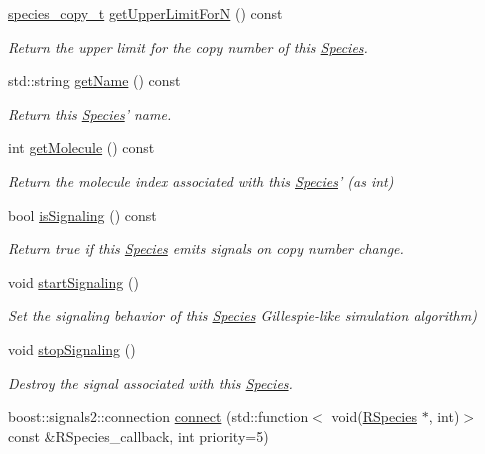 \begin{DoxyCompactItemize}
\hyperlink{common_8h_a3503f321fd36304ee274141275cca586}{species\-\_\-copy\-\_\-t} \hyperlink{classchem_1_1Species_a05fbe0a05f028beb1bb729f19d44a56a}{get\-Upper\-Limit\-For\-N} () const 
\begin{DoxyCompactList}\small\item\em Return the upper limit for the copy number of this \hyperlink{classchem_1_1Species}{Species}. \end{DoxyCompactList}\item 
std\-::string \hyperlink{classchem_1_1Species_aa32c8f7fb344c68539a927c6a7f916c7}{get\-Name} () const 
\begin{DoxyCompactList}\small\item\em Return this \hyperlink{classchem_1_1Species}{Species}' name. \end{DoxyCompactList}\item 
int \hyperlink{classchem_1_1Species_a330ef4514a8979a6ea0e6f71ed5cb820}{get\-Molecule} () const 
\begin{DoxyCompactList}\small\item\em Return the molecule index associated with this \hyperlink{classchem_1_1Species}{Species}' (as int) \end{DoxyCompactList}\item 
bool \hyperlink{classchem_1_1Species_aa412f592e88600b48e3df591fc4cd655}{is\-Signaling} () const 
\begin{DoxyCompactList}\small\item\em Return true if this \hyperlink{classchem_1_1Species}{Species} emits signals on copy number change. \end{DoxyCompactList}\item 
void \hyperlink{classchem_1_1Species_a2d3d9f6e7c7d9c7bdd87ff5373a7d08c}{start\-Signaling} ()
\begin{DoxyCompactList}\small\item\em Set the signaling behavior of this \hyperlink{classchem_1_1Species}{Species} Gillespie-\/like simulation algorithm) \end{DoxyCompactList}\item 
void \hyperlink{classchem_1_1Species_a9d34195d05f3e35e00dd20892ff7393b}{stop\-Signaling} ()
\begin{DoxyCompactList}\small\item\em Destroy the signal associated with this \hyperlink{classchem_1_1Species}{Species}. \end{DoxyCompactList}\item 
boost\-::signals2\-::connection \hyperlink{classchem_1_1Species_a9a582e18e231a65761cb10c14d0a0a68}{connect} (std\-::function$<$ void(\hyperlink{classchem_1_1RSpecies}{R\-Species} $\ast$, int)$>$ const \&R\-Species\-\_\-callback, int priority=5)

\end{DoxyCompactItemize}
